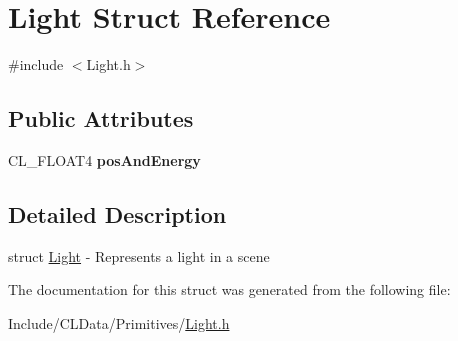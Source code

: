 \hypertarget{struct_light}{}\section{Light Struct Reference}
\label{struct_light}


{\ttfamily \#include $<$Light.\+h$>$}

\subsection*{Public Attributes}
\begin{DoxyCompactItemize}
\item 
C\+L\+\_\+\+F\+L\+O\+A\+T4 {\bfseries pos\+And\+Energy}\hypertarget{struct_light_aabb8fcf923d39542298810f2add8e71e}{}\label{struct_light_aabb8fcf923d39542298810f2add8e71e}

\end{DoxyCompactItemize}


\subsection{Detailed Description}
struct \hyperlink{struct_light}{Light} -\/ Represents a light in a scene 

The documentation for this struct was generated from the following file\+:\begin{DoxyCompactItemize}
\item 
Include/\+C\+L\+Data/\+Primitives/\hyperlink{_light_8h}{Light.\+h}\end{DoxyCompactItemize}
